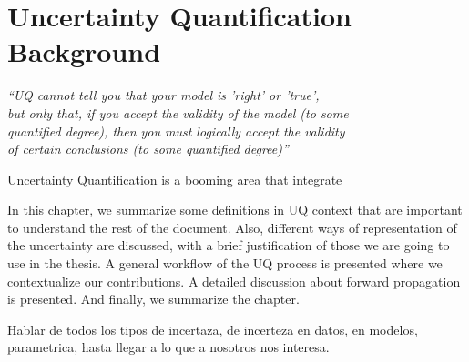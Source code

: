 

\chapter{Uncertainty Quantification Background}\label{cap:backgroud}


\begin{flushright}
	\textit{``UQ cannot tell you that your model is 'right' or 'true', \\
	but only that, if you accept the validity of the model (to some \\
	quantified degree), then you must logically accept the validity\\
	of certain conclusions (to some quantified degree)''\\
	\cite{Sullivan2015}}
\end{flushright}

Uncertainty Quantification is a booming area that integrate 

In this chapter, we summarize some definitions in UQ context that are important to understand the rest of the document. Also, different ways of representation of the uncertainty are discussed, with a brief justification of those we are going to use in the thesis. A general workflow of the UQ process is presented where we contextualize our contributions. A detailed discussion about forward propagation is presented. And finally, we summarize the chapter.

Hablar de todos los tipos de incertaza, de incerteza en datos, en modelos, parametrica, hasta llegar a lo que a nosotros nos interesa.

